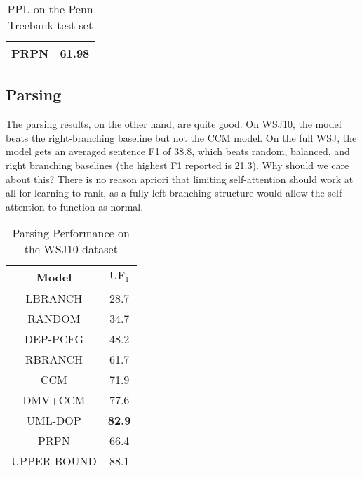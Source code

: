 \documentclass{article}
\begin{document}
\begin{table}[h!]
\begin{tabular}{ c c }
    \hline                                                                       
    PRPN & 61.98 \\                                                              
    \toprule[2pt]                                                                
  \end{tabular}                                                                  
  \caption{PPL on the Penn Treebank test set}                                    
  \label{tab_ptb_word}                                                           
\end{table}                                                                      


\subsection{Parsing}
The parsing results, on the other hand, are quite good.
On WSJ10, the model beats the right-branching baseline but not the CCM model.
On the full WSJ, the model gets an averaged sentence F1 of 38.8,
which beats random, balanced, and right branching baselines
(the highest F1 reported is 21.3).
Why should we care about this?
There is no reason apriori that limiting self-attention should work at all
for learning to rank, as a fully left-branching structure would
allow the self-attention to function as normal. 

\begin{table}[h!]                                    
\centering                                          
  \begin{tabular}{ c c }                            
    \toprule[2pt]                                   
    Model & $\mathrm{UF}_1$ \\                      
    \hline                                          
    LBRANCH &  28.7 \\                              
    RANDOM & 34.7 \\                                
    DEP-PCFG \citep{carroll1992two} & 48.2 \\       
    RBRANCH & 61.7 \\                               
    CCM \citep{klein2002generative} & 71.9 \\       
    DMV+CCM \citep{klein2005natural} & 77.6 \\      
    UML-DOP \citep{bod2006all} & \textbf{82.9} \\   
    \hline                                          
    PRPN & 66.4 \\                                 
    \hline                                          
    UPPER BOUND & 88.1 \\                           
    \toprule[2pt]                                   
  \end{tabular}                                     
  \caption{Parsing Performance on the WSJ10 dataset}
  \label{tb_parser}                                 
\end{table}                                         
\end{document}
